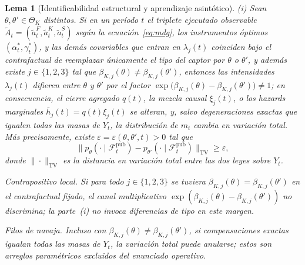 \documentclass[review,authoryear,12pt]{elsarticle}
\theoremstyle{plain}
\newtheorem{lemma}[theorem]{Lema}
\theoremstyle{definition}
\newcommand{\ThetaK}{\Theta_K}
\newcommand{\1}{\mathbf{1}}
\begin{document}
\begin{lemma}[Identificabilidad estructural y aprendizaje asintótico]
\medskip
\noindent\textup{(i)}
Sean $\theta,\theta'\in\ThetaK$ distintos. Si en un período $t$ el triplete ejecutado observable $\tilde{A}_t=(\tilde{a}_t^F,\tilde{a}_t^K,\tilde{a}_t^S)$ según la ecuación~\eqref{eq:mdg}, los instrumentos óptimos $(\alpha_t^\ast,\gamma_t^\ast)$, y las demás covariables que entran en $\lambda_j(t)$ coinciden bajo el contrafactual de reemplazar únicamente el tipo del captor por $\theta$ o $\theta'$, y además existe $j\in\{1,2,3\}$ tal que $\beta_{K,j}(\theta)\neq \beta_{K,j}(\theta')$, entonces las intensidades $\lambda_j(t)$ difieren entre $\theta$ y $\theta'$ por el factor $\exp\bigl(\beta_{K,j}(\theta)-\beta_{K,j}(\theta')\bigr)\neq 1$; en consecuencia, el cierre agregado $q(t)$, la mezcla causal $\xi_j(t)$, o los hazards marginales $\bar h_j(t)=q(t)\xi_j(t)$ se alteran, y, salvo degeneraciones exactas que igualen todas las masas de $Y_t$, la distribución de $m_t$ cambia en variación total. Más precisamente, existe $\varepsilon=\varepsilon(\theta,\theta',t)>0$ tal que
\begin{equation}
\label{eq:TV-separation}
\bigl\| p_\theta(\cdot\mid \mathcal{F}_t^{\mathrm{pub}})-p_{\theta'}(\cdot\mid \mathcal{F}_t^{\mathrm{pub}})\bigr\|_{\mathrm{TV}}\ge \varepsilon,
\end{equation}
donde $\|\cdot\|_{\mathrm{TV}}$ es la distancia en variación total entre las dos leyes sobre $Y_t$.
\begin{list}{}{%
  \setlength{\leftmargin}{2.25em}%
  \setlength{\labelwidth}{2.25em}%
  \setlength{\labelsep}{0.45em}%
  \setlength{\itemsep}{0.35em}%
  \setlength{\parsep}{0pt}%
  \setlength{\topsep}{0.25em}%
}
\item[\textup{(C1)}] \textup{Contrapositivo local.}\quad
Si para todo $j\in\{1,2,3\}$ se tuviera $\beta_{K,j}(\theta)=\beta_{K,j}(\theta')$ en el contrafactual fijado, el canal multiplicativo $\exp(\beta_{K,j}(\theta)-\beta_{K,j}(\theta'))$ no discrimina; la parte~\textup{(i)} no invoca diferencias de tipo en este margen.
\item[\textup{(C2)}] \textup{Filos de navaja.}\quad
Incluso con $\beta_{K,j}(\theta)\neq\beta_{K,j}(\theta')$, si compensaciones exactas igualan todas las masas de $Y_t$, la variación total puede anularse; estos son arreglos paramétricos excluidos del enunciado operativo.
\end{list}


\end{lemma}
\end{document}

